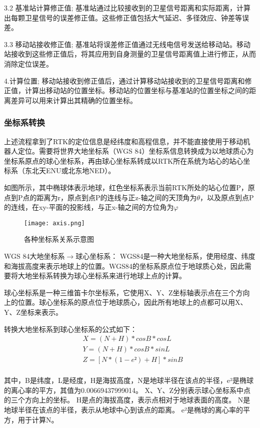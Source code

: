 3.2 基准站计算修正值;
基准站通过比较接收到的卫星信号距离和实际距离，计算出每颗卫星信号的误差修正值。这些修正值包括大气延迟、多径效应、钟差等误差。

3.3 移动站接收修正值;
基准站将误差修正值通过无线电信号发送给移动站。移动站接收到这些修正值后，将其应用到自身测量的卫星信号距离值上进行修正，从而消除定位误差。

4.计算位置;
移动站接收到修正值后，通过计算移动站接收到的卫星信号距离和修正值，计算出移动站的位置坐标。移动站的位置坐标与基准站的位置坐标之间的距离差异可以用来计算出其精确的位置坐标。

\subsubsection{坐标系转换}
上述流程拿到了RTK的定位信息是经纬度和高程信息，并不能直接使用于移动机器人定位。需要将世界大地坐标系（WGS 84）坐标系信息转换成为以地球质心为坐标系原点的球心坐标系，再由球心坐标系转成以RTK所在系统为站心的站心坐标系（东北天ENU或北东地NED）。

如图所示，其中椭球体表示地球，红色坐标系表示当前RTK所处的站心位置P，原点到P点的距离为r，原点到点P的连线与正z-轴之间的天顶角为$\theta $，以及原点到点P的连线，在xy-平面的投影线，与正x-轴之间的方位角为$\varphi$ 


\begin{figure}[ht]
    \centering
    \texttt{[image: axis.png]}
    \caption{各种坐标系关系示意图}
\end{figure}

WGS 84大地坐标系$\longrightarrow$球心坐标系：
WGS84是一种大地坐标系，使用经度、纬度和海拔高度来表示地球上的位置。WGS84的坐标系原点位于地球质心处，因此需要将大地坐标系转换为球心坐标系来进行地球上点的计算。

球心坐标系是一种三维笛卡尔坐标系，它使用X、Y、Z坐标轴表示点在三个方向上的位置。球心坐标系的原点位于地球质心，因此所有地球上的点都可以用X、Y、Z坐标来表示。

转换大地坐标系到球心坐标系的公式如下：
\begin{equation}
    \begin{aligned}
    &X = (N + H) * cosB * cosL \\
    &Y = (N + H) * cosB * sinL\\
    &Z = [N * (1 - e²) + H] * sinB\\
    \end{aligned}
\end{equation}

其中，B是纬度，L是经度，H是海拔高度，N是地球半径在该点的半径，e²是椭球的离心率的平方，其值为0.00669437999014。
X、Y、Z分别表示球心坐标系中点的三个方向上的坐标。
H是点的海拔高度，表示点相对于地球表面的高度。
N是地球半径在该点的半径，表示从地球中心到该点的距离。
e²是椭球的离心率的平方，用于计算N。

